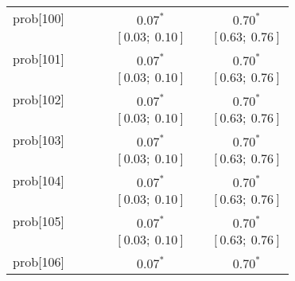 \begin{table}
\begin{center}
\begin{tabular}{l c c c c c c }
prob[100] &                           &                           &                           & $0.07^{*}$              &                           & $0.70^{*}$            \\
          &                           &                           &                           & $[0.03;\ 0.10]$         &                           & $[0.63;\ 0.76]$       \\
prob[101] &                           &                           &                           & $0.07^{*}$              &                           & $0.70^{*}$            \\
          &                           &                           &                           & $[0.03;\ 0.10]$         &                           & $[0.63;\ 0.76]$       \\
prob[102] &                           &                           &                           & $0.07^{*}$              &                           & $0.70^{*}$            \\
          &                           &                           &                           & $[0.03;\ 0.10]$         &                           & $[0.63;\ 0.76]$       \\
prob[103] &                           &                           &                           & $0.07^{*}$              &                           & $0.70^{*}$            \\
          &                           &                           &                           & $[0.03;\ 0.10]$         &                           & $[0.63;\ 0.76]$       \\
prob[104] &                           &                           &                           & $0.07^{*}$              &                           & $0.70^{*}$            \\
          &                           &                           &                           & $[0.03;\ 0.10]$         &                           & $[0.63;\ 0.76]$       \\
prob[105] &                           &                           &                           & $0.07^{*}$              &                           & $0.70^{*}$            \\
          &                           &                           &                           & $[0.03;\ 0.10]$         &                           & $[0.63;\ 0.76]$       \\
prob[106] &                           &                           &                           & $0.07^{*}$              &                           & $0.70^{*}$            \\

\end{tabular}
\end{center}
\end{table}
